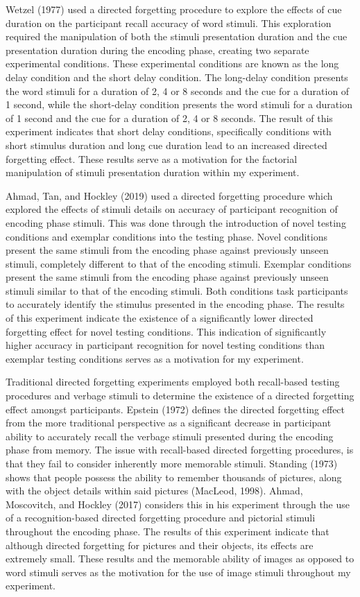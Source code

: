\documentclass[
  man,floatsintext]{apa6}
\begin{document}
Wetzel (1977) used a directed forgetting procedure to explore the effects of cue duration on the participant recall accuracy of word stimuli. This exploration required the manipulation of both the stimuli presentation duration and the cue presentation duration during the encoding phase, creating two separate experimental conditions. These experimental conditions are known as the long delay condition and the short delay condition. The long-delay condition presents the word stimuli for a duration of 2, 4 or 8 seconds and the cue for a duration of 1 second, while the short-delay condition presents the word stimuli for a duration of 1 second and the cue for a duration of 2, 4 or 8 seconds. The result of this experiment indicates that short delay conditions, specifically conditions with short stimulus duration and long cue duration lead to an increased directed forgetting effect. These results serve as a motivation for the factorial manipulation of stimuli presentation duration within my experiment.

Ahmad, Tan, and Hockley (2019) used a directed forgetting procedure which explored the effects of stimuli details on accuracy of participant recognition of encoding phase stimuli. This was done through the introduction of novel testing conditions and exemplar conditions into the testing phase. Novel conditions present the same stimuli from the encoding phase against previously unseen stimuli, completely different to that of the encoding stimuli. Exemplar conditions present the same stimuli from the encoding phase against previously unseen stimuli similar to that of the encoding stimuli. Both conditions task participants to accurately identify the stimulus presented in the encoding phase. The results of this experiment indicate the existence of a significantly lower directed forgetting effect for novel testing conditions. This indication of significantly higher accuracy in participant recognition for novel testing conditions than exemplar testing conditions serves as a motivation for my experiment.

Traditional directed forgetting experiments employed both recall-based testing procedures and verbage stimuli to determine the existence of a directed forgetting effect amongst participants. Epstein (1972) defines the directed forgetting effect from the more traditional perspective as a significant decrease in participant ability to accurately recall the verbage stimuli presented during the encoding phase from memory. The issue with recall-based directed forgetting procedures, is that they fail to consider inherently more memorable stimuli. Standing (1973) shows that people possess the ability to remember thousands of pictures, along with the object details within said pictures (MacLeod, 1998). Ahmad, Moscovitch, and Hockley (2017) considers this in his experiment through the use of a recognition-based directed forgetting procedure and pictorial stimuli throughout the encoding phase. The results of this experiment indicate that although directed forgetting for pictures and their objects, its effects are extremely small. These results and the memorable ability of images as opposed to word stimuli serves as the motivation for the use of image stimuli throughout my experiment.
\end{document}
